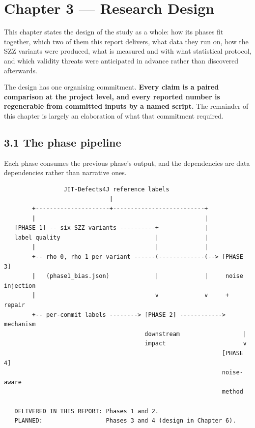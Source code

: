 \chapter{Chapter 3 --- Research Design}\label{chapter-3-research-design}

This chapter states the design of the study as a whole: how its phases
fit together, which two of them this report delivers, what data they run
on, how the SZZ variants were produced, what is measured and with what
statistical protocol, and which validity threats were anticipated in
advance rather than discovered afterwards.

The design has one organising commitment. \textbf{Every claim is a
paired comparison at the project level, and every reported number is
regenerable from committed inputs by a named script.} The remainder of
this chapter is largely an elaboration of what that commitment required.

\section{3.1 The phase pipeline}\label{the-phase-pipeline}

Each phase consumes the previous phase's output, and the dependencies
are data dependencies rather than narrative ones.

\begin{verbatim}
                 JIT-Defects4J reference labels
                              |
        +---------------------+--------------------------+
        |                                                |
   [PHASE 1] -- six SZZ variants ----------+             |
   label quality                           |             |
        |                                  |             |
        +-- rho_0, rho_1 per variant ------(-------------(--> [PHASE 3]
        |   (phase1_bias.json)             |             |     noise injection
        |                                  v             v     + repair
        +-- per-commit labels --------> [PHASE 2] ------------> mechanism
                                        downstream                  |
                                        impact                      v
                                                              [PHASE 4]
                                                              noise-aware
                                                              method

   DELIVERED IN THIS REPORT: Phases 1 and 2.
   PLANNED:                  Phases 3 and 4 (design in Chapter 6).
\end{verbatim}

